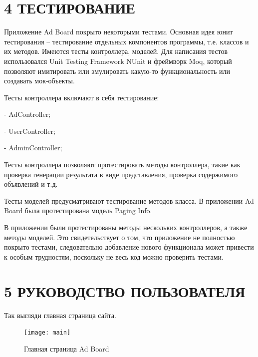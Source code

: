 \documentclass[14pt,a4paper]{extreport}
\begin{document}
	\newpage
	\section*{\normalsize\hspace{4ex}4 ТЕСТИРОВАНИЕ}
	\parindent=1cm Приложение Ad Board покрыто некоторыми тестами. Основная идея юнит тестирования – тестирование отдельных компонентов программы, т.е. классов и их методов. Имеются тесты контроллера, моделей. Для написания тестов использовался Unit Testing Framework NUnit и фреймворк Moq, который позволяют имитировать или эмулировать какую-то функциональность или создавать мок-объекты. \par
	Тесты контроллера включают в себя тестирование:\par
	- AdController;\par
	- UserController;\par
	- AdminController;\par
	Тесты контроллера позволяют протестировать методы контроллера, такие как проверка генерации результата в виде представления, проверка содержимого объявлений и т.д.\par
	Тесты моделей предусматривают тестирование методов класса. В приложении Ad Board была протестирована модель Paging Info.\par
	В приложении были протестированы методы нескольких контроллеров, а также методы моделей. Это свидетельствует о том, что приложение не полностью покрыто тестами, следовательно добавление нового функционала может привести к особым трудностям, поскольку не весь код можно проверить тестами.\par

	\newpage
	\section*{\normalsize\hspace{4ex}5 РУКОВОДСТВО ПОЛЬЗОВАТЕЛЯ}
	
	\parindent=1cm Так выгляди главная страница сайта.\par
	\begin{figure}[h]
	\begin{center}
	\texttt{[image: main]}
	\caption{Главная страница Ad Board}
	\end{center}
	\end{figure}  
\end{document}
